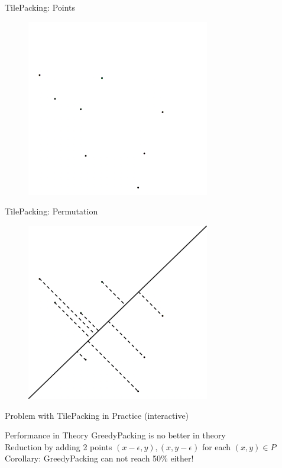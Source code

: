 \documentclass[11pt, british]{beamer}
\begin{document}
\begin{frame}{TilePacking: Points}
  \begin{figure}
    \centering
    \includegraphics[width=8cm]{points original.png}
  \end{figure}
\end{frame}

\begin{frame}{TilePacking: Permutation}
  \begin{figure}
    \centering
    \includegraphics[width=8cm]{points manhattan.png}
  \end{figure}
\end{frame}

\begin{frame}{Problem with TilePacking in Practice}
  (interactive)
\end{frame}

\begin{frame}{Performance in Theory}
  GreedyPacking is no better in theory \\

  Reduction by adding 2 points $(x - \epsilon, y), (x, y - \epsilon)$ for each $(x,y) \in P$ \\

  Corollary: GreedyPacking can not reach 50\% either!
\end{frame}
\end{document}
